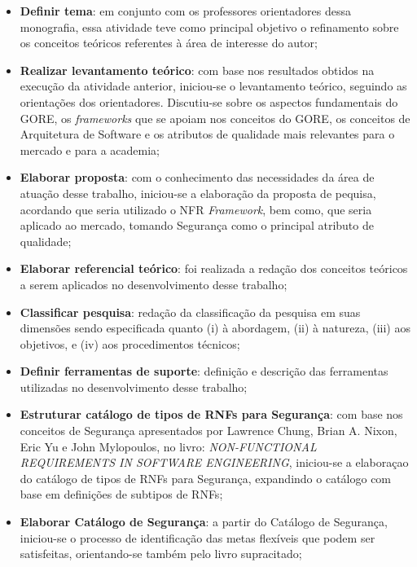 \begin{itemize}
	\item \textbf{Definir tema}: em conjunto com os professores orientadores dessa monografia, essa atividade teve como principal objetivo o refinamento sobre os conceitos teóricos referentes à área de interesse do autor;
	
	\item \textbf{Realizar levantamento teórico}: com base nos resultados obtidos na execução da atividade anterior, iniciou-se o levantamento teórico, seguindo as orientações dos orientadores. Discutiu-se sobre os aspectos fundamentais do GORE, os \textit{frameworks} que se apoiam nos conceitos do GORE, os conceitos de Arquitetura de Software e os atributos de qualidade mais relevantes para o mercado e para a academia;
	
	\item \textbf{Elaborar proposta}: com o conhecimento das necessidades da área de atuação desse trabalho, iniciou-se a elaboração da proposta de pequisa, acordando que seria utilizado o NFR \textit{Framework}, bem como, que seria aplicado ao mercado, tomando Segurança como o principal atributo de qualidade;  
	
	\item \textbf{Elaborar referencial teórico}: foi realizada a redação dos conceitos teóricos a serem aplicados no desenvolvimento desse trabalho; 
	
	\item \textbf{Classificar pesquisa}: redação  da classificação da pesquisa em suas dimensões sendo especificada quanto (i) à abordagem, (ii) à natureza, (iii) aos objetivos, e (iv) aos procedimentos técnicos;
	
	\item \textbf{Definir ferramentas de suporte}: definição e descrição das ferramentas utilizadas no desenvolvimento desse trabalho;
	
	\item \textbf{Estruturar catálogo de tipos de RNFs para Segurança}: com base nos conceitos de Segurança apresentados por Lawrence Chung, Brian A. Nixon, Eric Yu e John Mylopoulos, no  livro: \textit{NON-FUNCTIONAL REQUIREMENTS
	IN SOFTWARE ENGINEERING}, iniciou-se a elaboraçao  do catálogo de tipos de RNFs para Segurança, expandindo o catálogo com base em definições de subtipos de RNFs;
	
	\item \textbf{Elaborar Catálogo de Segurança}: a partir do Catálogo de Segurança, iniciou-se o processo de identificação das metas flexíveis que podem ser satisfeitas, orientando-se também pelo livro supracitado;
	

\end{itemize}
